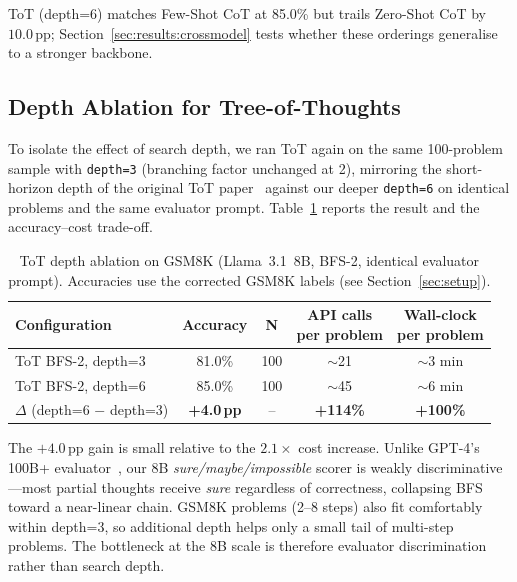 \documentclass[conference]{IEEEtran}
\begin{document}
ToT (depth=6) matches Few-Shot CoT at 85.0\% but trails Zero-Shot CoT
by $10.0$\,pp; Section~\ref{sec:results:crossmodel} tests whether these
orderings generalise to a stronger backbone.

\subsection{Depth Ablation for Tree-of-Thoughts}
\label{sec:results:depth}

To isolate the effect of search depth, we ran ToT again on the same
100-problem sample with \texttt{depth=3} (branching factor unchanged at
2), mirroring the short-horizon depth of the original ToT
paper~\cite{yao2023tot} against our deeper \texttt{depth=6} on identical
problems and the same evaluator prompt.
Table~\ref{tab:depth} reports the result and the accuracy--cost
trade-off.

\begin{table}[t]
\centering
\caption{ToT depth ablation on GSM8K (Llama~3.1~8B, BFS-2,
identical evaluator prompt). Accuracies use the corrected GSM8K labels
(see Section~\ref{sec:setup}).}
\label{tab:depth}
\begin{tabular}{@{}lcccc@{}}
\toprule
\textbf{Configuration} & \textbf{Accuracy} & \textbf{N} &
\makecell{\textbf{API calls}\\\textbf{per problem}} &
\makecell{\textbf{Wall-clock}\\\textbf{per problem}} \\
\midrule
ToT BFS-2, depth=3 & 81.0\% & 100 & $\sim$21 & $\sim$3 min \\
ToT BFS-2, depth=6 & 85.0\% & 100 & $\sim$45 & $\sim$6 min \\
\midrule
$\Delta$ (depth=6 $-$ depth=3) & \textbf{+4.0\,pp} & -- &
\textbf{+114\%} & \textbf{+100\%} \\
\bottomrule
\end{tabular}
\end{table}

The $+4.0$\,pp gain is small relative to the $2.1\times$ cost increase.
Unlike GPT-4's 100B+ evaluator~\cite{yao2023tot}, our 8B
\textit{sure/maybe/impossible} scorer is weakly discriminative---most
partial thoughts receive \textit{sure} regardless of correctness,
collapsing BFS toward a near-linear chain.
GSM8K problems (2--8 steps) also fit comfortably within depth=3,
so additional depth helps only a small tail of multi-step problems.
The bottleneck at the 8B scale is therefore evaluator discrimination
rather than search depth.
\end{document}
